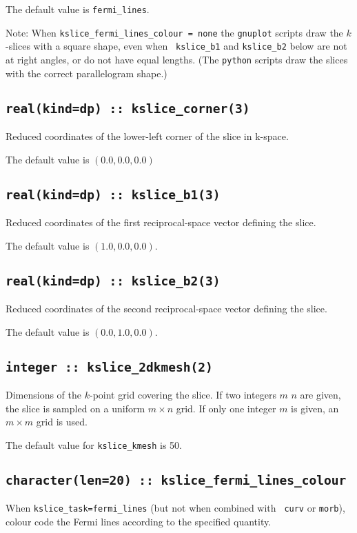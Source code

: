 The default value is {\tt fermi\_lines}.

Note: When {\tt kslice\_fermi\_lines\_colour = none} the {\tt gnuplot}
scripts draw the $k$-slices with a square shape, even when {\tt
  kslice\_b1} and {\tt kslice\_b2} below are not at right angles, or
do not have equal lengths.  (The {\tt python} scripts draw the slices
with the correct parallelogram shape.)

\subsection[kslice\_corner]{\tt real(kind=dp) :: kslice\_corner(3)}
Reduced coordinates of the lower-left corner of the slice in k-space.

The default value is $(0.0,0.0,0.0)$

\subsection[kslice\_corner]{\tt real(kind=dp) :: kslice\_b1(3)}
Reduced coordinates of the first reciprocal-space vector 
defining the slice.

The default value is $(1.0,0.0,0.0)$.

\subsection[kslice\_corner]{\tt real(kind=dp) :: kslice\_b2(3)}
Reduced coordinates of the second reciprocal-space vector 
defining the slice.

The default value is $(0.0,1.0,0.0)$.

\subsection[kslice\_num\_points]{\tt integer :: kslice\_2dkmesh(2)}

Dimensions of the $k$-point grid covering the slice.
If two integers $m$ $n$ are given, the slice is sampled on a uniform
$m\times n$ grid.  If only one integer $m$ is given, an $m\times m$
grid is used.

The default value for \verb#kslice_kmesh# is 50.


\subsection[kpath\_colour]{\tt character(len=20) ::
  kslice\_fermi\_lines\_colour}
When {\tt kslice\_task=fermi\_lines} (but not when combined with {\tt
  curv} or {\tt morb}), colour code the Fermi lines according to the
specified quantity.

